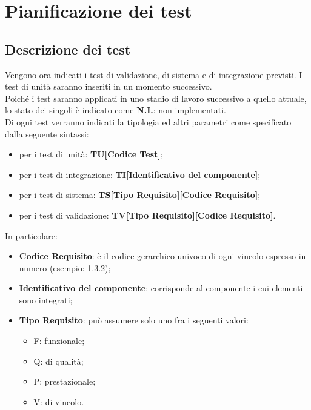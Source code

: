 \section{Pianificazione dei test}
\label{sec:5}
	\subsection{Descrizione dei test}
	\label{sec:5.1}
		Vengono ora indicati i test di validazione, di sistema e di integrazione previsti. I test di unità saranno inseriti in un momento successivo. \\
		Poiché i test saranno applicati in uno stadio di lavoro successivo a quello attuale, lo stato dei singoli è indicato come \textbf{N.I.}: non implementati. \\
		Di ogni test verranno indicati la tipologia ed altri parametri come specificato dalla seguente sintassi:
		\begin{itemize}
					\item per i test di unità: \textbf{TU[Codice Test]};
					\item per i test di integrazione: \textbf{TI[Identificativo del componente]};
					\item per i test di sistema: \textbf{TS[Tipo Requisito][Codice Requisito]};
					\item per i test di validazione: \textbf{TV[Tipo Requisito][Codice Requisito]}.
		\end{itemize}
		In particolare:
		\begin{itemize}
			\item \textbf{Codice Requisito}: è il codice gerarchico univoco di ogni vincolo espresso in numero (esempio: 1.3.2);
			\item \textbf{Identificativo del componente}: corrisponde al componente i cui elementi sono integrati;
			\item \textbf{Tipo Requisito}: può assumere solo uno fra i seguenti valori:
			\begin{itemize}
				\item F: funzionale;
				\item Q: di qualità;
				\item P: prestazionale;
				\item V: di vincolo.
			\end{itemize}
		\end{itemize}
